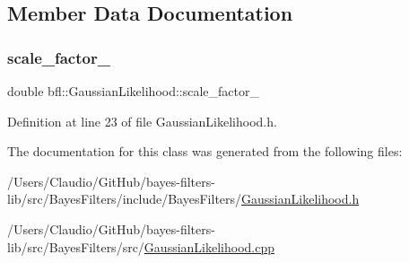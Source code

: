 \subsection{Member Data Documentation}
\mbox{\label{classbfl_1_1GaussianLikelihood_ad08436040da927c3a2bdeac9eab8aedf}} 
\subsubsection{\texorpdfstring{scale\+\_\+factor\+\_\+}{scale\_factor\_}}
{\footnotesize\ttfamily double bfl\+::\+Gaussian\+Likelihood\+::scale\+\_\+factor\+\_\+\hspace{0.3cm}{\ttfamily [protected]}}



Definition at line 23 of file Gaussian\+Likelihood.\+h.



The documentation for this class was generated from the following files\+:\begin{DoxyCompactItemize}
\item 
/\+Users/\+Claudio/\+Git\+Hub/bayes-\/filters-\/lib/src/\+Bayes\+Filters/include/\+Bayes\+Filters/\mbox{\hyperlink{GaussianLikelihood_8h}{Gaussian\+Likelihood.\+h}}\item 
/\+Users/\+Claudio/\+Git\+Hub/bayes-\/filters-\/lib/src/\+Bayes\+Filters/src/\mbox{\hyperlink{GaussianLikelihood_8cpp}{Gaussian\+Likelihood.\+cpp}}\end{DoxyCompactItemize}
